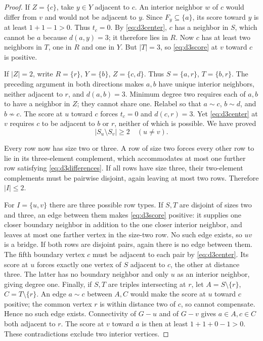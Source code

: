 \begin{proof}
If $Z=\{c\}$, take $y\in Y$ adjacent to $c$. An interior neighbor
$w$ of $c$ would differ from $v$ and would not be adjacent to $y$.
Since $F_y\subseteq\{a\}$, its score toward $y$ is at least
$1+1-1>0$. Thus $t_c=0$. By \eqref{eq:d3center}, $c$ has a neighbor
in $S$, which cannot be $a$ because $d(a,y)=3$; it therefore lies in $R$.
Now $c$ has at least two neighbors in $T$, one in $R$ and one in $Y$.
But $|T|=3$, so \eqref{eq:d3score} at $v$ toward $c$ is positive.

If $|Z|=2$, write $R=\{r\}$, $Y=\{b\}$, $Z=\{c,d\}$.
Thus $S=\{a,r\}$, $T=\{b,r\}$. The preceding argument in both
directions makes $a,b$ have unique interior neighbors, neither adjacent to
$r$, and $d(a,b)=3$. Minimum degree two requires each of $a,b$ to have
a neighbor in $Z$; they cannot share one. Relabel so that $a\sim c$,
$b\sim d$, and $b\not\sim c$. The score at $u$ toward $c$ forces
$t_c=0$ and $d(c,r)=3$. Yet \eqref{eq:d3center} at $v$ requires $c$
to be adjacent to $b$ or $r$, neither of which is possible.
We have proved
\begin{equation}\label{eq:d3differences}
 |S_u\setminus S_v|\ge2\quad(u\ne v).
\end{equation}

Every row now has size two or three. A row of size two forces every other
row to lie in its three-element complement, which accommodates at most
one further row satisfying \eqref{eq:d3differences}. If all rows have
size three, their two-element complements must be pairwise disjoint,
again leaving at most two rows. Therefore $|I|\le2$.

For $I=\{u,v\}$ there are three possible row types. If $S,T$ are
disjoint of sizes two and three, an edge between them makes
\eqref{eq:d3score} positive: it supplies one closer boundary neighbor
in addition to the one closer interior neighbor, and leaves at most one
farther vertex in the size-two row. No such edge exists, so $uv$ is a
bridge. If both rows are disjoint pairs, again there is no edge between
them. The fifth boundary vertex $c$ must be adjacent to each pair by
\eqref{eq:d3center}. Its score at $u$ forces exactly one vertex of $S$
adjacent to $c$, the other at distance three. The latter has no boundary
neighbor and only $u$ as an interior neighbor, giving degree one.
Finally, if $S,T$ are triples intersecting at $r$, let $A=S\setminus\{r\}$,
$C=T\setminus\{r\}$. An edge $a\sim c$ between $A,C$ would make
the score at $u$ toward $c$ positive; the common vertex $r$ is within
distance two of $c$, so cannot compensate. Hence no such edge exists.
Connectivity of $G-u$ and of $G-v$ gives $a\in A,c\in C$ both
adjacent to $r$. The score at $v$ toward $a$ is then at least
$1+1+0-1>0$. These contradictions exclude two interior vertices.


\end{proof}
